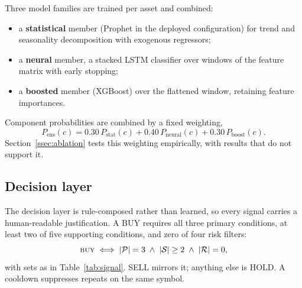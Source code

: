 \documentclass[preprint,12pt,authoryear]{elsarticle}
\begin{document}
Three model families are trained per asset and combined:
\begin{itemize}
\item a \textbf{statistical} member (Prophet in the deployed configuration) for
trend and seasonality decomposition with exogenous regressors;
\item a \textbf{neural} member, a stacked LSTM classifier over windows of the
feature matrix with early stopping;
\item a \textbf{boosted} member (XGBoost) over the flattened window, retaining
feature importances.
\end{itemize}
Component probabilities are combined by a fixed weighting,
\begin{equation}
P_{\text{ens}}(c) = 0.30\,P_{\text{stat}}(c) + 0.40\,P_{\text{neural}}(c) + 0.30\,P_{\text{boost}}(c).
\label{eq:ensemble}
\end{equation}
Section~\ref{ssec:ablation} tests this weighting empirically, with results that
do not support it.

\subsection{Decision layer}
\label{ssec:signal}

The decision layer is rule-composed rather than learned, so every signal carries
a human-readable justification. A BUY requires all three primary conditions, at
least two of five supporting conditions, and zero of four risk filters:
\begin{equation}
\textsc{buy} \iff |\mathcal{P}| = 3 \;\wedge\; |\mathcal{S}| \ge 2 \;\wedge\; |\mathcal{R}| = 0 ,
\label{eq:signal}
\end{equation}
with sets as in Table~\ref{tab:signal}. SELL mirrors it; anything else is HOLD.
A cooldown suppresses repeats on the same symbol.
\end{document}
